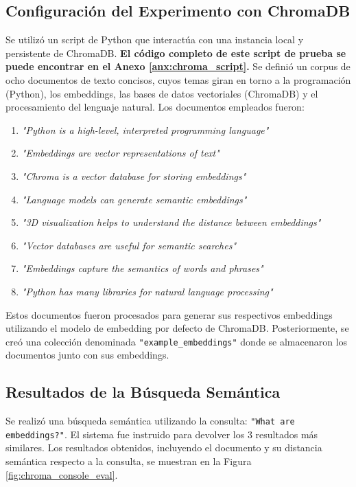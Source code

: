 \subsection{Configuración del Experimento con ChromaDB}
Se utilizó un script de Python que interactúa con una instancia local y persistente de ChromaDB. \textbf{El código completo de este script de prueba se puede encontrar en el Anexo \ref{anx:chroma_script}.} Se definió un corpus de ocho documentos de texto concisos, cuyos temas giran en torno a la programación (Python), los embeddings, las bases de datos vectoriales (ChromaDB) y el procesamiento del lenguaje natural. Los documentos empleados fueron:
\begin{enumerate}
    \item \textit{"Python is a high-level, interpreted programming language"}
    \item \textit{"Embeddings are vector representations of text"}
    \item \textit{"Chroma is a vector database for storing embeddings"}
    \item \textit{"Language models can generate semantic embeddings"}
    \item \textit{"3D visualization helps to understand the distance between embeddings"}
    \item \textit{"Vector databases are useful for semantic searches"}
    \item \textit{"Embeddings capture the semantics of words and phrases"}
    \item \textit{"Python has many libraries for natural language processing"}
\end{enumerate}
Estos documentos fueron procesados para generar sus respectivos embeddings utilizando el modelo de embedding por defecto de ChromaDB. Posteriormente, se creó una colección denominada \texttt{"example\_embeddings"} donde se almacenaron los documentos junto con sus embeddings.

\subsection{Resultados de la Búsqueda Semántica}
Se realizó una búsqueda semántica utilizando la consulta: \texttt{"What are embeddings?"}. El sistema fue instruido para devolver los 3 resultados más similares. Los resultados obtenidos, incluyendo el documento y su distancia semántica respecto a la consulta, se muestran en la Figura \ref{fig:chroma_console_eval}.

